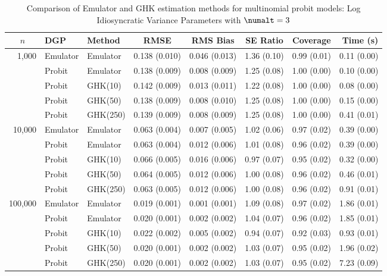 \begin{table}[htbp]
\centering
\footnotesize
\begin{tabular}{@{}rllrrrrr@{}}
\toprule
\multicolumn{1}{c}{$n$} & \multicolumn{1}{l}{DGP} & \multicolumn{1}{l}{Method} & \multicolumn{1}{c}{RMSE} & \multicolumn{1}{c}{RMS Bias} & \multicolumn{1}{c}{SE Ratio} & \multicolumn{1}{c}{Coverage} & \multicolumn{1}{r}{Time (s)} \\
\midrule
\multirow{5}{*}{1,000} & Emulator & Emulator & 0.138 (0.010) & 0.046 (0.013) & 1.36 (0.10) & 0.99 (0.01) & 0.11 (0.00) \\
 & Probit & Emulator & 0.138 (0.009) & 0.008 (0.009) & 1.25 (0.08) & 1.00 (0.00) & 0.10 (0.00) \\
 & Probit & GHK(10) & 0.142 (0.009) & 0.013 (0.011) & 1.22 (0.08) & 1.00 (0.00) & 0.08 (0.00) \\
 & Probit & GHK(50) & 0.138 (0.009) & 0.008 (0.010) & 1.25 (0.08) & 1.00 (0.00) & 0.15 (0.00) \\
 & Probit & GHK(250) & 0.139 (0.009) & 0.008 (0.009) & 1.25 (0.08) & 1.00 (0.00) & 0.41 (0.01) \\
\midrule
\multirow{5}{*}{10,000} & Emulator & Emulator & 0.063 (0.004) & 0.007 (0.005) & 1.02 (0.06) & 0.97 (0.02) & 0.39 (0.00) \\
 & Probit & Emulator & 0.063 (0.004) & 0.012 (0.006) & 1.01 (0.08) & 0.96 (0.02) & 0.39 (0.00) \\
 & Probit & GHK(10) & 0.066 (0.005) & 0.016 (0.006) & 0.97 (0.07) & 0.95 (0.02) & 0.32 (0.00) \\
 & Probit & GHK(50) & 0.064 (0.005) & 0.012 (0.006) & 1.00 (0.08) & 0.96 (0.02) & 0.46 (0.01) \\
 & Probit & GHK(250) & 0.063 (0.005) & 0.012 (0.006) & 1.00 (0.08) & 0.96 (0.02) & 0.91 (0.01) \\
\midrule
\multirow{5}{*}{100,000} & Emulator & Emulator & 0.019 (0.001) & 0.001 (0.001) & 1.09 (0.08) & 0.97 (0.02) & 1.86 (0.01) \\
 & Probit & Emulator & 0.020 (0.001) & 0.002 (0.002) & 1.04 (0.07) & 0.96 (0.02) & 1.85 (0.01) \\
 & Probit & GHK(10) & 0.022 (0.002) & 0.005 (0.002) & 0.94 (0.07) & 0.92 (0.03) & 0.93 (0.01) \\
 & Probit & GHK(50) & 0.020 (0.001) & 0.002 (0.002) & 1.03 (0.07) & 0.95 (0.02) & 1.96 (0.02) \\
 & Probit & GHK(250) & 0.020 (0.001) & 0.002 (0.002) & 1.03 (0.07) & 0.95 (0.02) & 7.23 (0.09) \\
\bottomrule
\end{tabular}
\caption{Comparison of Emulator and GHK estimation methods for multinomial probit models: Log Idiosyncratic Variance Parameters with $\numalt=3$}
\label{tab:emulator_vs_ghk:3:logpsi}
\end{table}